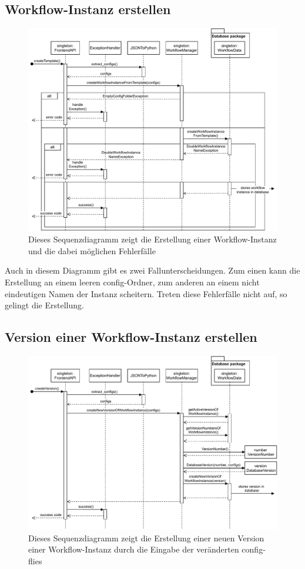 \subsection{Workflow-Instanz erstellen}
\begin{figure}[H]
	\centering
	\includegraphics[width=\textwidth]{res/createWorkflowInstance.pdf} 
	\caption{Dieses Sequenzdiagramm zeigt die Erstellung einer Workflow-Instanz und die dabei möglichen Fehlerfälle}
\end{figure}
Auch in diesem Diagramm gibt es zwei Fallunterscheidungen. Zum einen kann die Erstellung an einem leeren config-Ordner, zum anderen an einem nicht eindeutigen Namen der Instanz scheitern. Treten diese Fehlerfälle nicht auf, so gelingt die Erstellung.
\subsection{Version einer Workflow-Instanz erstellen}
\begin{figure}[H]
	\centering
	\includegraphics[width=\textwidth]{res/createVersion.pdf} 
	\caption{Dieses Sequenzdiagramm zeigt die Erstellung einer neuen Version einer Workflow-Instanz durch die Eingabe der veränderten config-flies}
\end{figure}